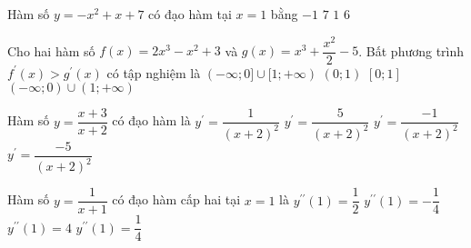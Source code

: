 \begin{ex}%
	Hàm số $y=-x^2+x+7$ có đạo hàm tại $x=1$ bằng
	\choice
	{\True $-1$}
	{$7$} 
	{$1$}
	{$6$}
\end{ex}
\begin{ex}%
	Cho hai hàm số $f(x)=2 x^3-x^2+3$ và $g(x)=x^3+\dfrac{x^2}{2}-5$.
	Bất phương trình $f^{\prime}(x)>g^{\prime}(x)$ có tập nghiệm là
	\choice
	{$(-\infty ; 0] \cup[1 ;+\infty)$}
	{$(0 ; 1)$}
	{$[0 ; 1]$}
	{\True $(-\infty ; 0) \cup(1 ;+\infty)$}
\end{ex}
\begin{ex}%
	Hàm số $y=\dfrac{x+3}{x+2}$ có đạo hàm là
	\choice
	{$y^{\prime}=\dfrac{1}{(x+2)^2}$}
	{$y^{\prime}=\dfrac{5}{(x+2)^2}$}
	{\True $y^{\prime}=\dfrac{-1}{(x+2)^2}$}
	{$y^{\prime}=\dfrac{-5}{(x+2)^2}$}
\end{ex}
\begin{ex}%
	Hàm số $y=\dfrac{1}{x+1}$ có đạo hàm cấp hai tại $x=1$ là
	\choice
	{$y^{\prime \prime}(1)=\dfrac{1}{2}$}
	{$y^{\prime \prime}(1)=-\dfrac{1}{4}$}
	{$y^{\prime \prime}(1)=4$}
	{\True $y^{\prime \prime}(1)=\dfrac{1}{4}$}
\end{ex}
